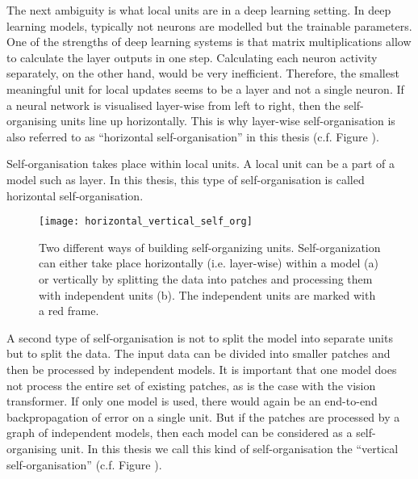 The next ambiguity is what local units are in a deep learning setting.
In deep learning models, typically not neurons are modelled but the trainable parameters.
One of the strengths of deep learning systems is that matrix multiplications allow to calculate the layer outputs in one step.
Calculating each neuron activity separately, on the other hand, would be very inefficient.
Therefore, the smallest meaningful unit for local updates seems to be a layer and not a single neuron.
If a neural network is visualised layer-wise from left to right, then the self-organising units line up horizontally. This is why layer-wise self-organisation is also referred to as ``horizontal self-organisation'' in this thesis (c.f. Figure ).

\begin{implementation}
	Self-organisation takes place within local units. A local unit can be a part of a model such as layer.
	In this thesis, this type of self-organisation is called horizontal self-organisation.
\end{implementation}

\begin{figure}[h]
    \centering
    \texttt{[image: horizontal\_vertical\_self\_org]}
    \caption[Overview of horizontal and vertical self-organization]{Two different ways of building self-organizing units. Self-organization can either take place horizontally (i.e. layer-wise) within a model (a) or vertically by splitting the data into patches and processing them with independent units (b). The independent units are marked with a red frame.}
\end{figure}
 
A second type of self-organisation is not to split the model into separate units but to split the data.
The input data can be divided into smaller patches and then be processed by independent models.
It is important that one model does not process the entire set of existing patches, as is the case with the vision transformer. If only one model is used, there would again be an end-to-end backpropagation of error on a single unit.
But if the patches are processed by a graph of independent models, then each model can be considered as a self-organising unit.
In this thesis we call this kind of self-organisation the ``vertical self-organisation'' (c.f. Figure ).

